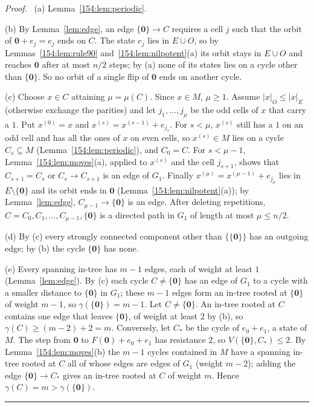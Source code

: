 \documentclass[10pt,a4paper]{article}
\newcommand{\qedmark}{\rule{1.1ex}{1.1ex}}
\newenvironment{proof}[1][Proof]{\par\smallskip\noindent\textit{#1.}\ }{\hfill\qedmark\par\smallskip}
\newcommand{\zero}{\mathbf{0}}                %
\newcommand{\Gone}{G_1}                       %
\begin{document}
\begin{proof}
(a) Lemma~\ref{154:lem:periodic}.

(b) By Lemma~\ref{lem:edge}, an edge $\{\zero\}\to C$ requires a cell $j$ such that the orbit of
$\zero+e_j=e_j$ ends on $C$. The state $e_j$ lies in $E\cup O$, so by Lemmas~\ref{154:lem:rule90}
and~\ref{154:lem:nilpotent}(a) its orbit stays in $E\cup O$ and reaches $\zero$ after at most $n/2$ steps; by (a)
none of its states lies on a cycle other than $\{\zero\}$. So no orbit of a single flip of $\zero$ ends on another
cycle.

(c) Choose $x\in C$ attaining $\mu=\mu(C)$. Since $x\in M$, $\mu\ge 1$. Assume $|x|_O\le|x|_E$ (otherwise exchange
the parities) and let $j_1,\dots,j_\mu$ be the odd cells of $x$ that carry a $1$. Put $x^{(0)}=x$ and
$x^{(s)}=x^{(s-1)}+e_{j_s}$. For $s<\mu$, $x^{(s)}$ still has a $1$ on an odd cell and has all the ones of $x$ on
even cells, so $x^{(s)}\in M$ lies on a cycle $C_s\subseteq M$ (Lemma~\ref{154:lem:periodic}), and $C_0=C$. For
$s<\mu-1$, Lemma~\ref{154:lem:moves}(a), applied to $x^{(s)}$ and the cell $j_{s+1}$, shows that $C_{s+1}=C_s$ or
$C_s\to C_{s+1}$ is an edge of $\Gone$. Finally $x^{(\mu)}=x^{(\mu-1)}+e_{j_\mu}$ lies in $E\setminus\{\zero\}$ and
its orbit ends in $\zero$ (Lemma~\ref{154:lem:nilpotent}(a)); by Lemma~\ref{lem:edge}, $C_{\mu-1}\to\{\zero\}$ is an
edge. After deleting repetitions, $C=C_0,C_1,\dots,C_{\mu-1},\{\zero\}$ is a directed path in $\Gone$ of length at
most $\mu\le n/2$.

(d) By (c) every strongly connected component other than $\{\{\zero\}\}$ has an outgoing edge; by (b) the cycle
$\{\zero\}$ has none.

(e) Every spanning in-tree has $m-1$ edges, each of weight at least $1$ (Lemma~\ref{lem:edge}). By (c) each cycle
$C\neq\{\zero\}$ has an edge of $\Gone$ to a cycle with a smaller distance to $\{\zero\}$ in $\Gone$; these $m-1$
edges form an in-tree rooted at $\{\zero\}$ of weight $m-1$, so $\gamma(\{\zero\})=m-1$. Let $C\neq\{\zero\}$. An
in-tree rooted at $C$ contains one edge that leaves $\{\zero\}$, of weight at least $2$ by (b), so
$\gamma(C)\ge(m-2)+2=m$. Conversely, let $C_*$ be the cycle of $e_0+e_1$, a state of $M$. The step from $\zero$ to
$F(\zero)+e_0+e_1$ has resistance $2$, so $V(\{\zero\},C_*)\le 2$. By Lemma~\ref{154:lem:moves}(b) the $m-1$ cycles
contained in $M$ have a spanning in-tree rooted at $C$ all of whose edges are edges of $\Gone$ (weight $m-2$);
adding the edge $\{\zero\}\to C_*$ gives an in-tree rooted at $C$ of weight $m$. Hence
$\gamma(C)=m>\gamma(\{\zero\})$.


\end{proof}
\end{document}
